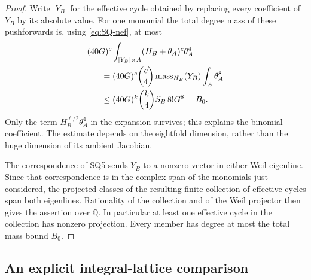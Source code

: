 \documentclass[11pt,a4paper]{article}
\theoremstyle{definition}\newtheorem{definition}[theorem]{Definition}
\theoremstyle{remark}\newtheorem{remark}[theorem]{Remark}
\newcommand{\Q}{\mathbb Q}\newcommand{\Z}{\mathbb Z}\newcommand{\C}{\mathbb C}\newcommand{\R}{\mathbb R}
\newcommand{\findingref}[1]{\hyperref[#1]{\textsf{#1}}}
\begin{document}
\begin{proof}
Write $|Y_B|$ for the effective cycle obtained by replacing every coefficient of $Y_B$ by its absolute value. For one monomial the total degree mass of these pushforwards is, using \eqref{eq:SQ-nef}, at most
\begin{align*}
 &(40G)^c\int_{|Y_B|\times A}
                     (H_B+\theta_A)^c\theta_A^4\\
 &\hspace{6mm}=(40G)^c\binom c4
            \operatorname{mass}_{H_B}(Y_B)\int_A\theta_A^8\\
 &\hspace{6mm}\le(40G)^k\binom k4S_B\,8!G^8=B_0.
\end{align*}
Only the term $H_B^{\ell/2}\theta_A^4$ in the expansion survives; this explains the binomial coefficient. The estimate depends on the eightfold dimension, rather than the huge dimension of its ambient Jacobian.

The correspondence of \findingref{SQ5} sends $Y_B$ to a nonzero vector in either Weil eigenline. Since that correspondence is in the complex span of the monomials just considered, the projected classes of the resulting finite collection of effective cycles span both eigenlines. Rationality of the collection and of the Weil projector then gives the assertion over $\Q$. In particular at least one effective cycle in the collection has nonzero projection. Every member has degree at most the total mass bound $B_0$.
\end{proof}

\subsection{An explicit integral-lattice comparison}
\end{document}
